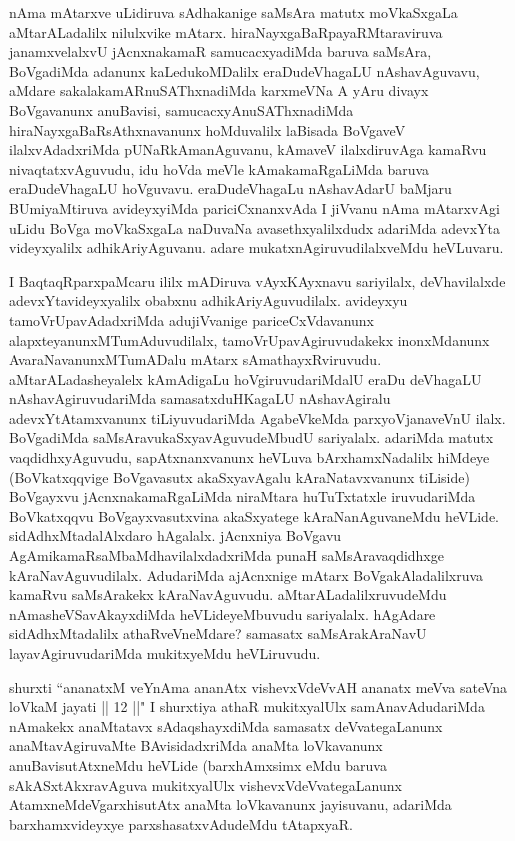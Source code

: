 \begin{artha}
nAma mAtarxve uLidiruva sAdhakanige saMsAra matutx moVkaSxgaLa aMtarALadalilx nilulxvike mAtarx. hiraNayxgaBaRpayaRMtaraviruva janamxvelalxvU jAcnxnakamaR samucacxyadiMda baruva saMsAra, BoVgadiMda adanunx kaLedukoMDalilx eraDudeVhagaLU nAshavAguvavu, aMdare sakalakamARnuSAThxnadiMda karxmeVNa A yAru divayx BoVgavanunx anuBavisi, samucacxyAnuSAThxnadiMda hiraNayxgaBaRsAthxnavanunx hoMduvalilx laBisada BoVgaveV ilalxvAdadxriMda pUNaRkAmanAguvanu, kAmaveV ilalxdiruvAga kamaRvu nivaqtatxvAguvudu, idu hoVda meVle kAmakamaRgaLiMda baruva eraDudeVhagaLU hoVguvavu. eraDudeVhagaLu nAshavAdarU baMjaru BUmiyaMtiruva avideyxyiMda pariciCxnanxvAda I jiVvanu nAma mAtarxvAgi uLidu BoVga moVkaSxgaLa naDuvaNa avasethxyalilxdudx adariMda adevxYta videyxyalilx adhikAriyAguvanu. adare mukatxnAgiruvudilalxveMdu heVLuvaru.
\end{artha}

\begin{artha}
I BaqtaqRparxpaMcaru ililx mADiruva vAyxKAyxnavu sariyilalx, deVhavilalxde adevxYtavideyxyalilx obabxnu adhikAriyAguvudilalx. avideyxyu tamoVrUpavAdadxriMda adujiVvanige pariceCxVdavanunx alapxteyanunxMTumAduvudilalx, tamoVrUpavAgiruvudakekx inonxMdanunx AvaraNavanunxMTumADalu mAtarx sAmathayxRviruvudu. aMtarALadasheyalelx kAmAdigaLu hoVgiruvudariMdalU eraDu deVhagaLU nAshavAgiruvudariMda samasatxduHKagaLU nAshavAgiralu adevxYtAtamxvanunx tiLiyuvudariMda AgabeVkeMda parxyoVjanaveVnU ilalx. BoVgadiMda saMsAravukaSxyavAguvudeMbudU sariyalalx. adariMda matutx vaqdidhxyAguvudu, sapAtxnanxvanunx heVLuva bArxhamxNadalilx hiMdeye (BoVkatxqqvige BoVgavasutx akaSxyavAgalu kAraNatavxvanunx tiLiside) BoVgayxvu jAcnxnakamaRgaLiMda niraMtara huTuTxtatxle iruvudariMda BoVkatxqqvu BoVgayxvasutxvina akaSxyatege kAraNanAguvaneMdu heVLide. sidAdhxMtadalAlxdaro hAgalalx. jAcnxniya BoVgavu AgAmikamaRsaMbaMdhavilalxdadxriMda punaH saMsAravaqdidhxge kAraNavAguvudilalx. AdudariMda ajAcnxnige mAtarx BoVgakAladalilxruva kamaRvu saMsArakekx kAraNavAguvudu. aMtarALadalilxruvudeMdu nAmasheVSavAkayxdiMda heVLideyeMbuvudu sariyalalx. hAgAdare sidAdhxMtadalilx athaRveVneMdare? samasatx saMsArakAraNavU layavAgiruvudariMda mukitxyeMdu heVLiruvudu.
\end{artha}

\begin{artha}
shurxti ``ananatxM veYnAma ananAtx vishevxVdeVvAH ananatx meVva sateVna loVkaM jayati || 12 ||" I shurxtiya athaR \ndash   mukitxyalUlx samAnavAdudariMda nAmakekx anaMtatavx sAdaqshayxdiMda samasatx deVvategaLanunx anaMtavAgiruvaMte BAvisidadxriMda anaMta loVkavanunx anuBavisutAtxneMdu heVLide (barxhAmxsimx eMdu baruva sAkASxtAkxravAguva mukitxyalUlx vishevxVdeVvategaLanunx AtamxneMdeVgarxhisutAtx anaMta loVkavanunx jayisuvanu, adariMda barxhamxvideyxye parxshasatxvAdudeMdu tAtapxyaR.
\end{artha}

